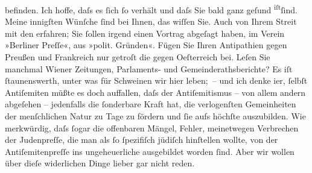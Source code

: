                befinden. Ich hoffe, daſs es ſich ſo verhält und daſs Sie bald ganz geſund \substVorne{}\textsuperscript{iſt}\substDazwischen{}ſind\substHinten{}. Meine innigſten Wünſche ſind bei Ihnen, {\pb}das wiſſen Sie. Auch von Ihrem Streit mit den \label{K_L00880-2v}\label{K_L00880-2}
               erfahren; Sie ſollen irgend einen Vortrag abgeſagt haben, im Verein »Berliner Preſſe«, aus »polit. Gründen«. Fügen Sie
               Ihren Antipathien gegen Preußen und Frankreich nur getroſt \introOben{}die\introOben{} gegen Oeſterreich bei. Leſen Sie manchmal Wiener Zeitungen, Parlaments- und
               Gemeinderathsberichte? Es iſt ſtaunenswerth, unter was für Schweinen wir hier
               leben; – und {\pb}ich denke i{\geminationm}er, ſelbſt Antiſemiten müßte es doch auffallen, daſs
               der Antiſemitismus – von allem andern abgeſehen – jedenfalls die ſonderbare Kraft
               hat, die verlogenſten Gemeinheiten der menſchlichen Natur zu Tage zu fördern und ſie
               aufs höchſte auszubilden. Wie merkwürdig, daſs ſogar die offenbaren Mängel, Fehler,
               meinetwegen Verbrechen der Judenpreſſe, die man als ſo ſpezifiſch jüdiſch hinſtellen
               wollte, von der Antiſemiten{\pb}preſſe ins
               ungeheuerliche ausgebildet worden ſind. Aber wir wollen über dieſe widerlichen Dinge
               lieber gar nicht reden.\pend
           
